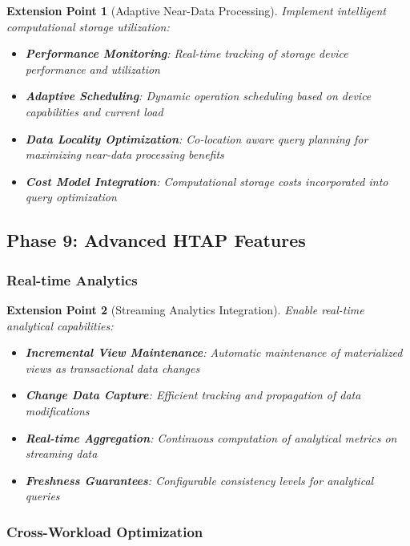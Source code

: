 \documentclass[12pt,a4paper]{article}
\newtheorem{extension}{Extension Point}[section]
\begin{document}
    \begin{extension}[Adaptive Near-Data Processing]
        Implement intelligent computational storage utilization:

        \begin{itemize}
            \item \textbf{Performance Monitoring}: Real-time tracking of storage device performance and utilization
            \item \textbf{Adaptive Scheduling}: Dynamic operation scheduling based on device capabilities and current load
            \item \textbf{Data Locality Optimization}: Co-location aware query planning for maximizing near-data processing benefits
            \item \textbf{Cost Model Integration}: Computational storage costs incorporated into query optimization
        \end{itemize}
    \end{extension}

    \subsection{Phase 9: Advanced HTAP Features}

    \subsubsection{Real-time Analytics}

    \begin{extension}[Streaming Analytics Integration]
        Enable real-time analytical capabilities:

        \begin{itemize}
            \item \textbf{Incremental View Maintenance}: Automatic maintenance of materialized views as transactional data changes
            \item \textbf{Change Data Capture}: Efficient tracking and propagation of data modifications
            \item \textbf{Real-time Aggregation}: Continuous computation of analytical metrics on streaming data
            \item \textbf{Freshness Guarantees}: Configurable consistency levels for analytical queries
        \end{itemize}
    \end{extension}

    \subsubsection{Cross-Workload Optimization}
\end{document}
